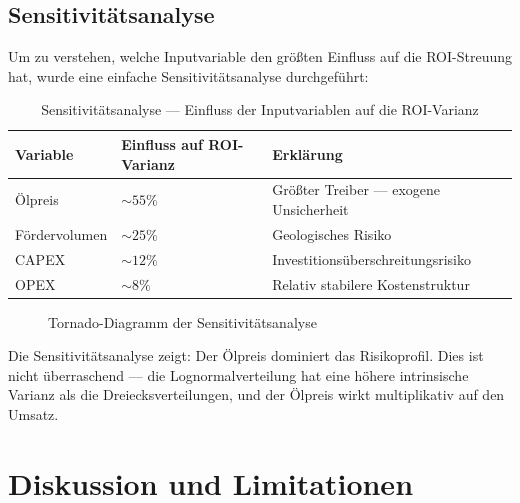 \documentclass[12pt,a4paper]{article}
\begin{document}
\subsection{Sensitivitätsanalyse}

Um zu verstehen, welche Inputvariable den größten Einfluss auf die ROI-Streuung hat, wurde eine einfache Sensitivitätsanalyse durchgeführt:

\begin{table}[H]
\centering
\begin{tabular}{llp{5.5cm}}
\toprule
\textbf{Variable} & \textbf{Einfluss auf ROI-Varianz} & \textbf{Erklärung} \\
\midrule
Ölpreis        & ${\sim}55\%$ & Größter Treiber — exogene Unsicherheit \\
Fördervolumen  & ${\sim}25\%$ & Geologisches Risiko \\
CAPEX          & ${\sim}12\%$ & Investitionsüberschreitungsrisiko \\
OPEX           & ${\sim}8\%$  & Relativ stabilere Kostenstruktur \\
\bottomrule
\end{tabular}
\caption{Sensitivitätsanalyse — Einfluss der Inputvariablen auf die ROI-Varianz}
\end{table}

\begin{figure}[H]
\centering
{}
\caption{Tornado-Diagramm der Sensitivitätsanalyse}
\end{figure}

Die Sensitivitätsanalyse zeigt: Der Ölpreis dominiert das Risikoprofil. Dies ist nicht überraschend — die Lognormalverteilung hat eine höhere intrinsische Varianz als die Dreiecksverteilungen, und der Ölpreis wirkt multiplikativ auf den Umsatz.

\section{Diskussion und Limitationen}
\label{sec:limitationen}
\end{document}
